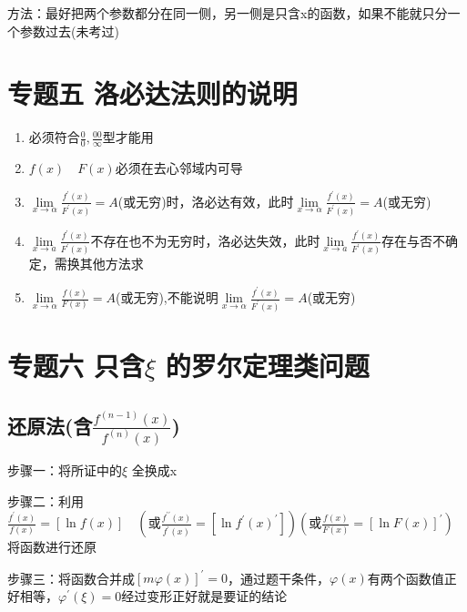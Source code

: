 \documentclass[a4paper,11pt]{book}
\begin{document}
    方法：最好把两个参数都分在同一侧，另一侧是只含x的函数，如果不能就只分一个参数过去(未考过)


\section*{专题五 \quad 洛必达法则的说明}


\begin{enumerate}
    \item 必须符合$\frac{0}{0}, \frac{00}{\infty}$型才能用
    \item $f(x) \quad F(x)$必须在去心邻域内可导
    \item $\lim \limits_{x \rightarrow \alpha} \frac{f^{\prime}(x)}{F^{\prime}(x)}=A$(或无穷)时，洛必达有效，此时$\lim \limits_{x \rightarrow \alpha} \frac{f^{\prime}(x)}{F^{\prime}(x)}=A$(或无穷)
    \item $\lim \limits_{x \rightarrow a} \frac{f^{\prime}(x)}{F^{\prime}(x)}$不存在也不为无穷时，洛必达失效，此时$\lim \limits_{x \rightarrow a} \frac{f^{\prime}(x)}{F^{\prime}(x)}$存在与否不确定，需换其他方法求
    \item $\lim \limits_{x \rightarrow \alpha} \frac{f(x)}{F(x)}=A$(或无穷),不能说明$\lim \limits _{x \rightarrow \alpha} \frac{f^{\prime}(x)}{F^{\prime}(x)}=A$(或无穷)
\end{enumerate}

\section*{专题六 \quad 只含$\xi$ 的罗尔定理类问题}

\subsection*{还原法(含$\displaystyle{\frac{f^{(n-1)}(x)}{f^{(n)}(x)}}$)}

步骤一：将所证中的$\xi$ 全换成x

\vspace{2ex}

\noindent 步骤二：利用$\displaystyle{\frac{f^{\prime}(x)}{f(x)}=\left[\ln f(x)\right]} \quad (\text{或}\frac{f^{\prime\prime}(x)}{f^{\prime}(x)}=\left[\ln f^{\prime}(x)^{\prime}\right]) (\text{或}\frac{f(x)}{F(x)}=\left[\ln F(x)\right]^{\prime})$
将函数进行还原

\vspace{2ex}

\noindent 步骤三：将函数合并成$\displaystyle{\left[m \varphi (x)\right]^{\prime}=0}$，通过题干条件，$\varphi (x)$有两个函数值正好相等，$\varphi ^{\prime}(\xi )=0$经过变形正好就是要证的结论
\end{document}
